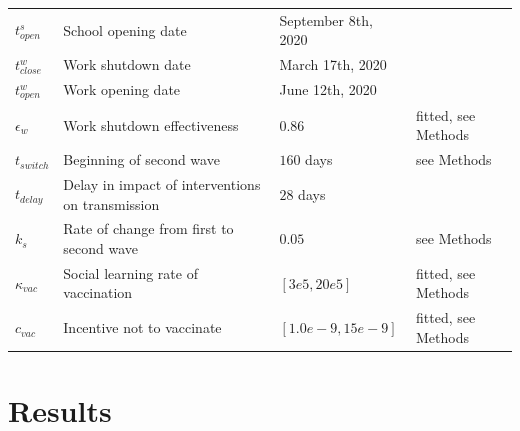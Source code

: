 \begin{table}[H]
\begin{tabular}{l p{5.5cm} l l}
  $ t^s_{open} $ & School opening date & September 8th, 2020 &  \cite{school_opening} \\
  $ t^w_{close} $ &   Work shutdown date & March 17th, 2020 & \cite{ontario_reopening}\\
  $ t^w_{open}  $ & Work opening date &  June 12th, 2020 & \cite{ontario_reopening}\\
  $ \epsilon_w $ & Work shutdown effectiveness & $0.86$ & fitted, see Methods \\
  $ t_{switch} $ & Beginning of second wave & $160 $ days &  see Methods \\ 
  $ t_{delay} $ & Delay in impact of interventions on transmission & $28$ days &  \cite{li2020temporal} \\ 
  $k_s$ & Rate of change from first to second wave & $0.05$ &  see Methods \\ 
  $ \kappa_{vac}$ & Social learning rate of vaccination & $[3e5,20e5] $& fitted, see Methods \\
  $ c_{vac}$ & Incentive not to vaccinate & $[1.0e-9,15e-9]$& fitted, see Methods \\
  \bottomrule  
  \end{tabular}
  \label{tab:params}
  \end{table}
\normalsize



\section{Results} 

